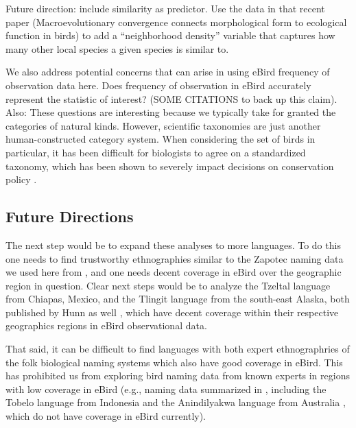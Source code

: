 \documentclass[10pt,letterpaper]{article}
\begin{document}
Future direction: include similarity as predictor. Use the data in that recent paper (Macroevolutionary convergence connects morphological form to ecological function in birds) to add a “neighborhood density” variable that captures how many other local species a given species is similar to.


We also address potential concerns that can arise in using eBird frequency of observation data here. Does frequency of observation in eBird accurately represent the statistic of interest? (SOME CITATIONS to back up this claim). Also: These questions are interesting because we typically take for granted the categories of natural kinds. However, scientific taxonomies are just another human-constructed category system. When considering the set of birds in particular, it has been difficult for biologists to agree on a standardized taxonomy, which has been shown to severely impact decisions on conservation policy \cite{peterson2006taxonomy,garnett2017taxonomy}.

\subsection{Future Directions}
The next step would be to expand these analyses to more languages. To do this one needs to find trustworthy ethnographies similar to the Zapotec naming data we used here from , and one needs decent coverage in eBird over the geographic region in question. Clear next steps would be to analyze the Tzeltal language from Chiapas, Mexico, and the Tlingit language from the south-east Alaska, both published by Hunn as well \cite{hunn1977tzeltal,hunn2012tlingit}, which have decent coverage within their respective geographics regions in eBird observational data. 

That said, it can be difficult to find languages with both expert ethnographries of the folk biological naming systems which also have good coverage in eBird. This has prohibited us from exploring bird naming data from known experts in regions with low coverage in eBird (e.g., naming data summarized in \cite{holman2002relation}, including the Tobelo language from Indonesia \cite{taylor1990folk} and the Anindilyakwa language from Australia \cite{waddy1988classification}, which do not have coverage in eBird currently).
\end{document}
